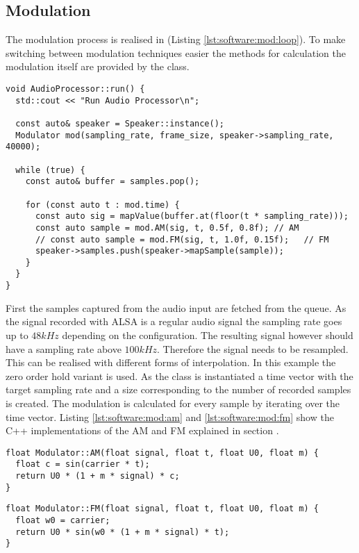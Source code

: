 \subsection{Modulation}
%
The modulation process is realised in  (Listing \ref{lst:software:mod:loop}). To make switching between modulation techniques easier the methods for calculation the modulation itself are provided by the  class.\p
%
\begin{mdframed}
\begin{lstlisting}[caption=Audio processing loop, label=lst:software:mod:loop]
void AudioProcessor::run() {
  std::cout << "Run Audio Processor\n";

  const auto& speaker = Speaker::instance();
  Modulator mod(sampling_rate, frame_size, speaker->sampling_rate, 40000);

  while (true) {
    const auto& buffer = samples.pop();

    for (const auto t : mod.time) {
      const auto sig = mapValue(buffer.at(floor(t * sampling_rate)));
      const auto sample = mod.AM(sig, t, 0.5f, 0.8f); // AM
      // const auto sample = mod.FM(sig, t, 1.0f, 0.15f);   // FM
      speaker->samples.push(speaker->mapSample(sample));
    }
  }
}
\end{lstlisting}
\end{mdframed}
%
First the samples captured from the audio input are fetched from the  queue. As the signal recorded with ALSA is a regular audio signal the sampling rate goes up to $48kHz$ depending on the configuration. The resulting signal however should have a sampling rate above $100kHz$. Therefore the signal needs to be resampled. This can be realised with different forms of interpolation. In this example the zero order hold variant is used.\p
%
As the  class is instantiated a time vector with the target sampling rate and a size corresponding to the number of recorded samples is created. The modulation is calculated for every sample by iterating over the time vector.\p
%
Listing \ref{lst:software:mod:am} and \ref{lst:software:mod:fm} show the C++ implementations of the AM and FM explained in section .
%
\begin{mdframed}
\begin{lstlisting}[caption=Amplitude modulation, label=lst:software:mod:am]
float Modulator::AM(float signal, float t, float U0, float m) {
  float c = sin(carrier * t);
  return U0 * (1 + m * signal) * c;
}
\end{lstlisting}
\end{mdframed}
%
\begin{mdframed}
\begin{lstlisting}[caption=Frequency modulation, label=lst:software:mod:fm]
float Modulator::FM(float signal, float t, float U0, float m) {
  float w0 = carrier;
  return U0 * sin(w0 * (1 + m * signal) * t);
}
\end{lstlisting}
\end{mdframed}